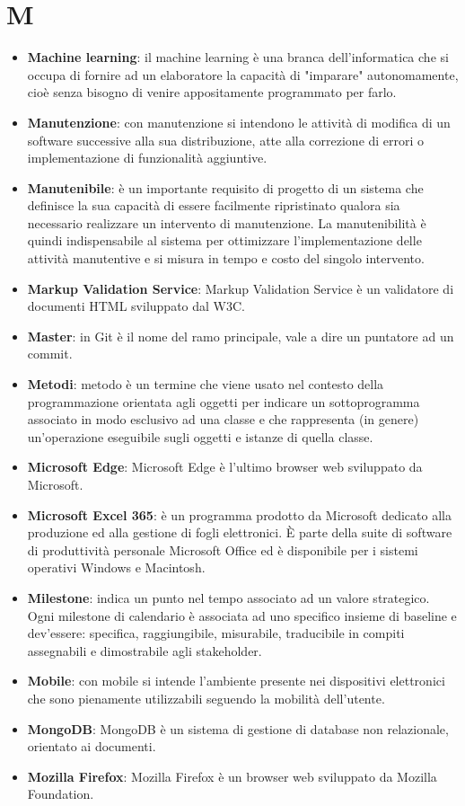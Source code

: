 \documentclass[a4paper, oneside, openany, dvipsnames, table]{article}
\begin{document}
\section{M}
\begin{itemize}
\item \textbf{Machine learning}: il machine learning è una branca dell'informatica che si occupa di fornire ad un elaboratore la capacità di "imparare" autonomamente, cioè senza bisogno di venire appositamente programmato per farlo.
\item \textbf{Manutenzione}: con manutenzione si intendono le attività di modifica di un software successive alla sua distribuzione, atte alla correzione di errori o implementazione di funzionalità aggiuntive.
\item \textbf{Manutenibile}: è un importante requisito di progetto di un sistema che definisce la sua capacità di essere facilmente ripristinato qualora sia necessario realizzare un intervento di manutenzione. La manutenibilità è quindi indispensabile al sistema per ottimizzare l'implementazione delle attività manutentive e si misura in tempo e costo del singolo intervento.
\item \textbf{Markup Validation Service}: Markup Validation Service è un validatore di documenti HTML sviluppato dal W3C.
\item \textbf{Master}: in Git è il nome del ramo principale, vale a dire un puntatore ad un commit.
\item \textbf{Metodi}: metodo è un termine che viene usato nel contesto della programmazione orientata agli oggetti per indicare un sottoprogramma associato in modo esclusivo ad una classe e che rappresenta (in genere) un'operazione eseguibile sugli oggetti e istanze di quella classe.
\item \textbf{Microsoft Edge}: Microsoft Edge è l'ultimo browser web sviluppato da Microsoft.
\item \textbf{Microsoft Excel 365}: è un programma prodotto da Microsoft dedicato alla produzione ed alla gestione di fogli elettronici. È parte della suite di software di produttività personale Microsoft Office ed è disponibile per i sistemi operativi Windows e Macintosh.
\item \textbf{Milestone}: indica un punto nel tempo associato ad un valore strategico. Ogni milestone di calendario è associata ad uno specifico insieme di baseline e dev'essere: specifica, raggiungibile, misurabile, traducibile in compiti assegnabili e dimostrabile agli stakeholder.
\item \textbf{Mobile}: con mobile si intende l'ambiente presente nei dispositivi elettronici che sono pienamente utilizzabili seguendo la mobilità dell'utente.
\item \textbf{MongoDB}: MongoDB è un sistema di gestione di database non relazionale, orientato ai documenti.
\item \textbf{Mozilla Firefox}: Mozilla Firefox è un browser web sviluppato da Mozilla Foundation.
\end{itemize}
\end{document}
